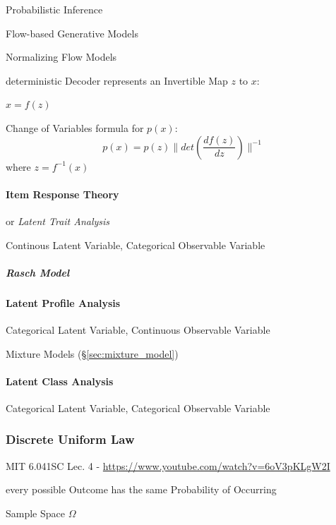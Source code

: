 Probabilistic Inference

Flow-based Generative Models

Normalizing Flow Models

deterministic Decoder represents an Invertible Map $z$ to $x$:

$x = f(z)$

Change of Variables formula for $p(x)$:
\[
  p(x) = p(z)\|det(\frac{df(z)}{dz})\|^{-1}
\]
where $z = f^{-1}(x)$



\paragraph{Item Response Theory}\label{sec:item_response_theory}\hfill

or \emph{Latent Trait Analysis}

Continous Latent Variable, Categorical Observable Variable



\subparagraph{Rasch Model}\label{sec:rasch_model}\hfill



\paragraph{Latent Profile Analysis}\label{sec:latent_profile_analysis}\hfill

Categorical Latent Variable, Continuous Observable Variable

\fist Mixture Models (\S\ref{sec:mixture_model})



\paragraph{Latent Class Analysis}\label{sec:latent_class_analysis}\hfill

Categorical Latent Variable, Categorical Observable Variable



\subsubsection{Discrete Uniform Law}\label{sec:discrete_uniform_law}

MIT 6.041SC Lec. 4 - \url{https://www.youtube.com/watch?v=6oV3pKLgW2I}

every possible Outcome has the same Probability of Occurring

Sample Space $\Omega$

